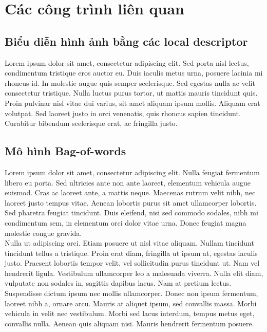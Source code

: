 \chapter{Các công trình liên quan}
\ifpdf
    \graphicspath{{Chapter2/Chapter2Figs/PNG/}{Chapter2/Chapter2Figs/PDF/}{Chapter2/Chapter2Figs/}}
\else
    \graphicspath{{Chapter2/Chapter2Figs/EPS/}{Chapter2/Chapter2Figs/}}
\fi

\section{Biểu diễn hình ảnh bằng các local descriptor}
Lorem ipsum dolor sit amet, consectetur adipiscing elit. Sed porta nisl lectus, condimentum tristique eros auctor eu. Duis iaculis metus urna, posuere lacinia mi rhoncus id. In molestie augue quis semper scelerisque. Sed egestas nulla ac velit consectetur tristique. Nulla luctus purus tortor, ut mattis mauris tincidunt quis. Proin pulvinar nisl vitae dui varius, sit amet aliquam ipsum mollis. Aliquam erat volutpat. Sed laoreet justo in orci venenatis, quis rhoncus sapien tincidunt. Curabitur bibendum scelerisque erat, ac fringilla justo.\\

\section{Mô hình Bag-of-words}
Lorem ipsum dolor sit amet, consectetur adipiscing elit. Nulla feugiat fermentum libero eu porta. Sed ultricies ante non ante laoreet, elementum vehicula augue euismod. Cras ac laoreet ante, a mattis neque. Maecenas rutrum velit nibh, nec laoreet justo tempus vitae. Aenean lobortis purus sit amet ullamcorper lobortis. Sed pharetra feugiat tincidunt. Duis eleifend, nisi sed commodo sodales, nibh mi condimentum sem, in elementum orci dolor vitae urna. Donec feugiat magna molestie congue gravida.\\

Nulla ut adipiscing orci. Etiam posuere ut nisl vitae aliquam. Nullam tincidunt tincidunt tellus a tristique. Proin erat diam, fringilla ut ipsum at, egestas iaculis justo. Praesent lobortis tempor velit, vel sollicitudin purus tincidunt ut. Nam vel hendrerit ligula. Vestibulum ullamcorper leo a malesuada viverra. Nulla elit diam, vulputate non sodales in, sagittis dapibus lacus. Nam at pretium lectus. Suspendisse dictum ipsum nec mollis ullamcorper. Donec non ipsum fermentum, laoreet nibh a, ornare arcu. Mauris at aliquet ipsum, sed convallis massa. Morbi vehicula in velit nec vestibulum. Morbi sed lacus interdum, tempus metus eget, convallis nulla. Aenean quis aliquam nisi. Mauris hendrerit fermentum posuere.\\


